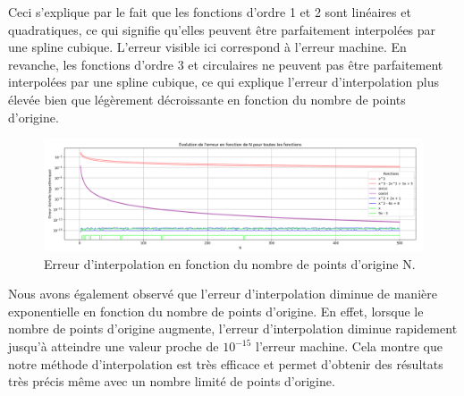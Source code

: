 \documentclass{article}
\begin{document}
Ceci s'explique par le fait que les fonctions d'ordre 1 et 2 sont linéaires et quadratiques, ce qui signifie qu'elles peuvent être parfaitement interpolées par une spline cubique. L'erreur visible ici correspond à l'erreur machine. En revanche, les fonctions d'ordre 3 et circulaires ne peuvent pas être parfaitement interpolées par une spline cubique, ce qui explique l'erreur d'interpolation plus élevée bien que légèrement décroissante en fonction du nombre de points d'origine.
\begin{figure}[H]
  \centering
  \includegraphics[width=\textwidth]{error_cs.png}
  \caption{Erreur d'interpolation en fonction du nombre de points d'origine N.}
  \label{fig:error}
\end{figure}
Nous avons également observé que l'erreur d'interpolation diminue de manière exponentielle en fonction du nombre de points d'origine. En effet, lorsque le nombre de points d'origine augmente, l'erreur d'interpolation diminue rapidement jusqu'à atteindre une valeur proche de $10^{-15}$ l'erreur machine. Cela montre que notre méthode d'interpolation est très efficace et permet d'obtenir des résultats très précis même avec un nombre limité de points d'origine.
\end{document}
